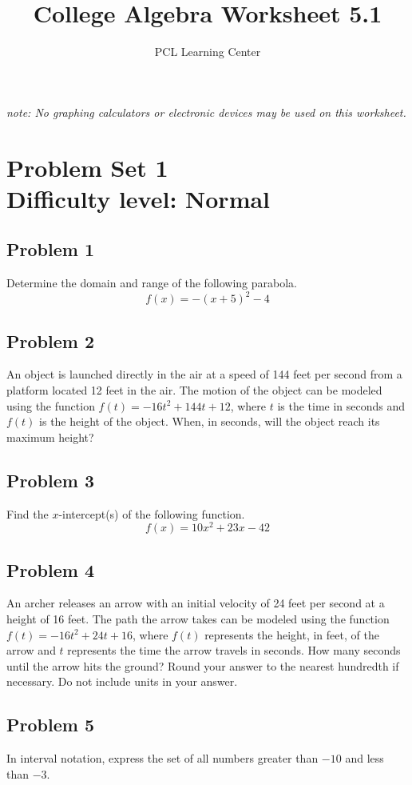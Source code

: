\documentclass[12pt]{article}
\title{College Algebra Worksheet 5.1}
\author{PCL Learning Center}
\date{}
\begin{document}
\maketitle

\begin{center}
    \textit{note: No graphing calculators or electronic devices may be used on this worksheet.}    
\end{center}

\section*{Problem Set 1\\Difficulty level: Normal}
\subsection*{Problem 1}
Determine the domain and range of the following parabola.
\[f(x)=-(x+5)^2-4\]

\subsection*{Problem 2}
An object is launched directly in the air at a speed of 144 feet per second from a platform located 12 feet in the air. The motion of the object can be modeled using the function \( f(t) = -16t^2 + 144t + 12 \), where \( t \) is the time in seconds and \( f(t) \) is the height of the object. When, in seconds, will the object reach its maximum height?

\subsection*{Problem 3}
Find the \(x\)-intercept(s) of the following function.
\[f(x)=10x^2+23x-42\]

\subsection*{Problem 4}
An archer releases an arrow with an initial velocity of 24 feet per second at a height of 16 feet. The path the arrow takes can be modeled using the function \( f(t) = -16t^2 + 24t + 16 \), where \( f(t) \) represents the height, in feet, of the arrow and \( t \) represents the time the arrow travels in seconds. How many seconds until the arrow hits the ground? Round your answer to the nearest hundredth if necessary. Do not include units in your answer.

\subsection*{Problem 5}
In interval notation, express the set of all numbers greater than \(-10\) and less than \(-3\).
\end{document}
